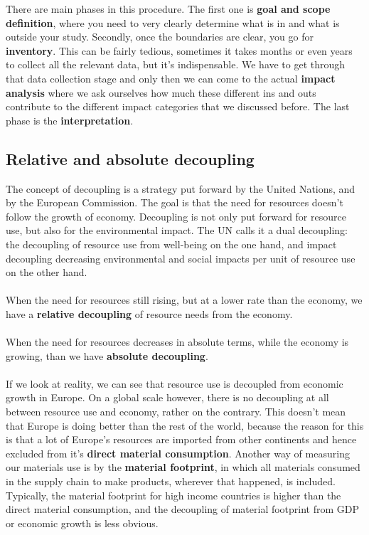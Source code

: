 \documentclass[../summary.tex]{subfiles}
\begin{document}
	There are main phases in this procedure. The first one is \textbf{goal and scope definition}, where you need to very clearly determine what is in and what is outside your study. Secondly, once the boundaries are clear, you go for \textbf{inventory}. This can be fairly tedious, sometimes it takes months or even years to collect all the relevant data, but it’s indispensable. We have to get through that data collection stage and only then we can come to the actual \textbf{impact analysis} where we ask ourselves how much these different ins and outs contribute to the different impact categories that we discussed before. The last phase is the \textbf{interpretation}.
	
	\subsection{Relative and absolute decoupling}
	
	The concept of decoupling is a strategy put forward by the United Nations, and by the European Commission. The goal is that the need for resources doesn’t follow the growth of economy. Decoupling is not only put forward for resource use, but also for the environmental impact. The UN calls it a dual decoupling: the decoupling of resource use from well-being on the one hand, and impact decoupling decreasing environmental and social impacts per unit of resource use on the other hand.
	\\\\
	When the need for resources still rising, but at a lower rate than the economy, we have a \textbf{relative decoupling} of resource needs from the economy.
	\\\\
	When the need for resources decreases in absolute terms, while the economy is growing, than we have \textbf{absolute decoupling}.
	\\\\
	If we look at reality, we can see that resource use is decoupled from economic growth in Europe. On a global scale however, there is no decoupling at all between resource use and economy, rather on the contrary. This doesn't mean that Europe is doing better than the rest of the world, because the reason for this is that a lot of Europe's resources are imported from other continents and hence excluded from it's \textbf{direct material consumption}. Another way of measuring our materials use is by the \textbf{material footprint}, in which all materials consumed in the supply chain to make products, wherever that happened, is included. Typically, the material footprint for high income countries is higher than the direct material consumption, and the decoupling of material footprint from GDP or economic growth is less obvious.
	
\end{document}
